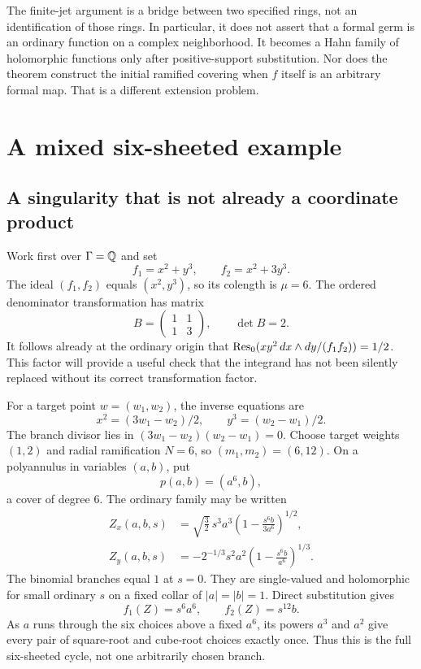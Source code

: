 \documentclass[11pt,letterpaper]{article}
\theoremstyle{definition}
\theoremstyle{remark}
\numberwithin{equation}{section}
\begin{document}
The finite-jet argument is a bridge between two specified rings, not an
identification of those rings. In particular, it does not assert that a
formal germ is an ordinary function on a complex neighborhood. It becomes a
Hahn family of holomorphic functions only after positive-support substitution.
Nor does the theorem construct the initial ramified covering when $f$ itself
is an arbitrary formal map. That is a different extension problem.

\section{A mixed six-sheeted example}
\label{sec:example}

\subsection{A singularity that is not already a coordinate product}
Work first over $\Gamma=\mathbb Q$ and set
\begin{equation}\label{eq:examplef}
 f_1=x^2+y^3,\qquad f_2=x^2+3y^3.
\end{equation}
The ideal $(f_1,f_2)$ equals $(x^2,y^3)$, so its colength is $\mu=6$.
The ordered denominator transformation has matrix
\[
 B=\begin{pmatrix}1&1\\1&3\end{pmatrix},\qquad \det B=2.
\]
It follows already at the ordinary origin that
$\operatorname{Res}_0(xy^2\,dx\wedge dy/(f_1f_2))=1/2$.
This factor will provide a useful check that the integrand has not been
silently replaced without its correct transformation factor.

For a target point $w=(w_1,w_2)$, the inverse equations are
\begin{equation}\label{eq:inverseexample}
 x^2=(3w_1-w_2)/2,\qquad y^3=(w_2-w_1)/2.
\end{equation}
The branch divisor lies in $(3w_1-w_2)(w_2-w_1)=0$. Choose target weights
$(1,2)$ and radial ramification $N=6$, so $(m_1,m_2)=(6,12)$. On a
polyannulus in variables $(a,b)$, put
\begin{equation}\label{eq:coverexample}
 p(a,b)=(a^6,b),
\end{equation}
a cover of degree $6$. The ordinary family may be written
\begin{align}
 Z_x(a,b,s)
 &=\sqrt{\frac32}\,s^3a^3
   \left(1-\frac{s^6b}{3a^6}\right)^{1/2},\label{eq:Zx}\\
 Z_y(a,b,s)
 &=-2^{-1/3}s^2a^2
   \left(1-\frac{s^6b}{a^6}\right)^{1/3}.\label{eq:Zy}
\end{align}
The binomial branches equal $1$ at $s=0$. They are single-valued and
holomorphic for small ordinary $s$ on a fixed collar of $|a|=|b|=1$.
Direct substitution gives
\[
 f_1(Z)=s^6a^6,\qquad f_2(Z)=s^{12}b.
\]
As $a$ runs through the six choices above a fixed $a^6$, its powers $a^3$
and $a^2$ give every pair of square-root and cube-root choices exactly once.
Thus this is the full six-sheeted cycle, not one arbitrarily chosen branch.
\end{document}
